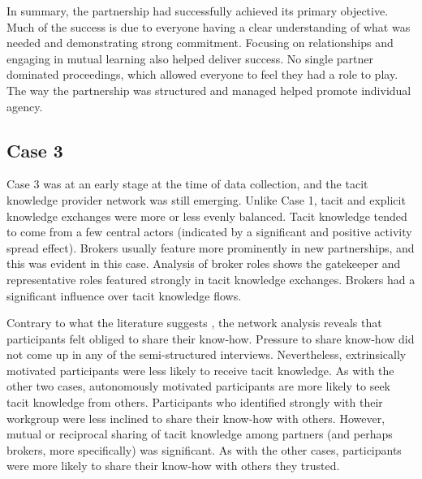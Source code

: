 In summary, the partnership had successfully achieved its primary objective. Much of the success is due to everyone having a clear understanding of what was needed and demonstrating strong commitment. Focusing on relationships and engaging in mutual learning also helped deliver success. No single partner dominated proceedings, which allowed everyone to feel they had a role to play. The way the partnership was structured and managed helped promote individual agency.

\subsection{Case 3}

Case 3 was at an early stage at the time of data collection, and the tacit knowledge provider network was still emerging. Unlike Case 1, tacit and explicit knowledge exchanges were more or less evenly balanced. Tacit knowledge tended to come from a few central actors (indicated by a significant and positive activity spread effect). Brokers usually feature more prominently in new partnerships, and this was evident in this case. Analysis of broker roles shows the gatekeeper and representative roles featured strongly in tacit knowledge exchanges. Brokers had a significant influence over tacit knowledge flows. \medskip   

Contrary to what the literature suggests \citep[e.g.][]{osterloh2000motivation,kaser2001knowledge,obrenovic2020enjoyment}, the network analysis reveals that participants felt obliged to share their know-how. Pressure to share know-how did not come up in any of the semi-structured interviews. Nevertheless, extrinsically motivated participants were less likely to receive tacit knowledge. As with the other two cases, autonomously motivated participants are more likely to seek tacit knowledge from others. Participants who identified strongly with their workgroup were less inclined to share their know-how with others. However, mutual or reciprocal sharing of tacit knowledge among partners (and perhaps brokers, more specifically) was significant. As with the other cases, participants were more likely to share their know-how with others they trusted. \medskip

